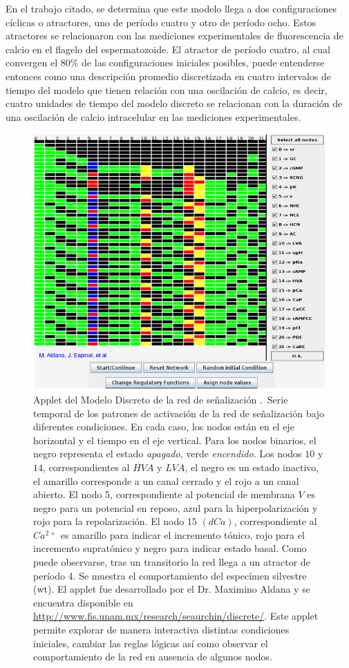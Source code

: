 En el trabajo citado, se determina que este modelo llega a dos configuraciones cíclicas o atractores, uno de período cuatro y otro de período ocho. Estos atractores se relacionaron con las mediciones experimentales de fluorescencia de calcio en el flagelo del espermatozoide. El atractor de período cuatro, al cual convergen el $80\%$ de las configuraciones iniciales posibles, puede entenderse entonces como una descripción promedio discretizada en cuatro intervalos de tiempo del modelo que tienen relación con una oscilación de calcio, es decir, cuatro unidades de tiempo del modelo discreto se relacionan con la duración de una oscilación de calcio intracelular en las mediciones experimentales.

\begin{figure}[hbt]
\includegraphics[width=0.9\linewidth%
]{gfx/appletErizo}
\caption[Applet del Modelos Discreto]{Applet del Modelo Discreto de la red de se\~nalizaci\'on \citeauthor{Espinal2011} \citep{Espinal2011}.\ Serie temporal de los patrones de activación de la red de señalización bajo diferentes condiciones. En cada caso, los nodos están en el eje horizontal y el tiempo en el eje vertical. Para los nodos binarios, el negro representa el estado \emph{apagado}, verde \emph{encendido}. Los nodos $10$ y $14$, correspondientes al $HVA$ y $LVA$, el negro es un estado inactivo, el amarillo corresponde a un canal cerrado y el rojo a un canal abierto. El nodo 5, correspondiente al potencial de membrana $V$ es negro para un potencial en reposo, azul para la hiperpolarización y rojo para la repolarización. El nodo 15 $(dCa)$, correspondiente al $Ca^{2+}$ es amarillo para indicar el incremento tónico, rojo para el incremento supratónico y negro para indicar estado basal. Como puede observarse, tras un transitorio la red llega a un atractor de período 4. Se muestra el comportamiento del especímen silvestre (wt).
El applet fue desarrollado por el Dr. Maximino Aldana y se encuentra disponible en \url{http://www.fis.unam.mx/research/seaurchin/discrete/}. Este applet permite explorar de manera interactiva distintas condiciones iniciales, cambiar las reglas lógicas así como observar el comportamiento de la red en ausencia de algunos nodos.}\label{fig:appletErizo}
\end{figure}
